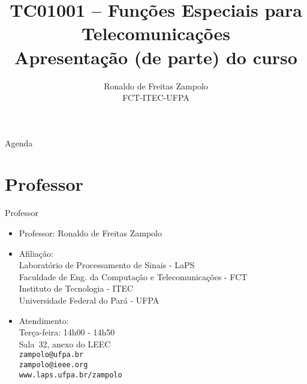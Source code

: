 \documentclass[
size=17pt,
paper=smartboard,
mode=present,
display=slidesnotes,
style=paintings,
nopagebreaks,
blackslide,
fleqn]{powerdot}
\title{\Large TC01001 -- Funções Especiais para Telecomunicações\\ \vspace{1cm}Apresentação (de parte) do curso}
\author{Ronaldo de Freitas Zampolo\\FCT-ITEC-UFPA}
\date{ }
\begin{document}
   \maketitle[randomdots={false}]
   \begin{slide}{Agenda}
      \tableofcontents[content=sections]
   \end{slide}

   \section[ slide = false ]{Professor }
      \begin{slide}[toc=]{Professor}
         \begin{itemize}
            \item Professor: Ronaldo de Freitas Zampolo
            \item Afiliação:\\
                  Laboratório de Processamento de Sinais - LaPS\\
                  Faculdade de Eng. da Computação e Telecomunicações - FCT\\
                  Instituto de Tecnologia - ITEC\\
                  Universidade Federal do Pará - UFPA
            \item Atendimento:\\
                  Terça-feira: 14h00 - 14h50\\
                  Sala~32, anexo do LEEC\\
                  \texttt{zampolo@ufpa.br}\\ 
                  \texttt{zampolo@ieee.org}\\
                  \texttt{www.laps.ufpa.br/zampolo}
         \end{itemize}
      \end{slide}
      
\end{document}
